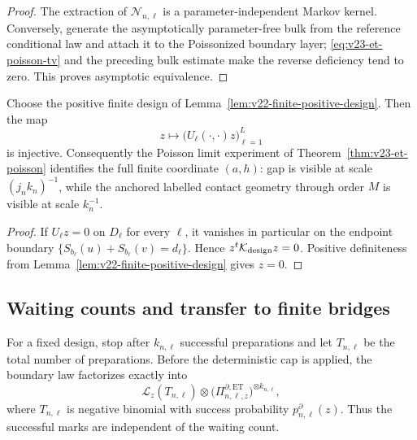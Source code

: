 \begin{proof}
The extraction of \(\mathcal N_{n,\ell}\) is a parameter-independent Markov
kernel.  Conversely, generate the asymptotically parameter-free bulk from the
reference conditional law and attach it to the Poissonized boundary layer;
\eqref{eq:v23-et-poisson-tv} and the preceding bulk estimate make the reverse
deficiency tend to zero.  This proves asymptotic equivalence.
\end{proof}

\begin{corollary}
\label{cor:v23-et-identification}
Choose the positive finite design of
Lemma~\ref{lem:v22-finite-positive-design}.  Then the map
\[
 z\longmapsto
 \bigl(U_\ell(\cdot,\cdot)z\bigr)_{\ell=1}^L
\]
is injective.  Consequently the Poisson limit experiment of
Theorem~\ref{thm:v23-et-poisson} identifies the full finite coordinate
\((a,h)\): gap is visible at scale \((j_nk_n)^{-1}\), while the anchored
labelled contact geometry through order \(M\) is visible at scale
\(k_n^{-1}\).
\end{corollary}

\begin{proof}
If \(U_\ell z=0\) on \(D_\ell\) for every \(\ell\), it vanishes in
particular on the endpoint boundary
\(\{S_{b_\ell}(u)+S_{b_\ell}(v)=d_\ell\}\).  Hence
\(z^t\mathcal K_{\rm design}z=0\).  Positive definiteness from
Lemma~\ref{lem:v22-finite-positive-design} gives \(z=0\).
\end{proof}

\subsection{Waiting counts and transfer to finite bridges}

For a fixed design, stop after \(k_{n,\ell}\) successful preparations and let
\(T_{n,\ell}\) be the total number of preparations.  Before the deterministic
cap is applied, the boundary law factorizes exactly into
\begin{equation}\label{eq:v23-et-factorization}
 \mathcal L_z(T_{n,\ell})
 \otimes
 \bigl(\Pi^{\partial,\mathrm{ET}}_{n,\ell,z}\bigr)^{\otimes k_{n,\ell}},
\end{equation}
where \(T_{n,\ell}\) is negative binomial with success probability
\(p^\partial_{n,\ell}(z)\).  Thus the successful marks are independent of the
waiting count.

